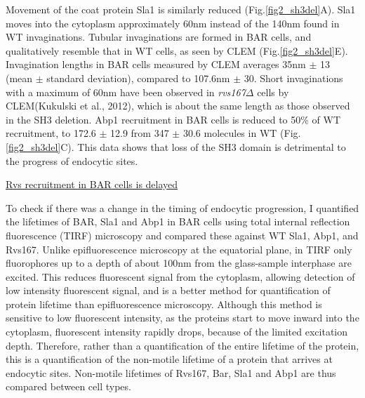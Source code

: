 Movement of the coat protein Sla1 is similarly reduced (Fig.\ref{fig2_sh3del}A). Sla1 moves into the cytoplasm approximately 60nm instead of the 140nm found in WT invaginations. Tubular invaginations are formed in BAR cells, and qualitatively resemble that in WT cells, as seen by CLEM  (Fig.\ref{fig2_sh3del}E). Invagination lengths in BAR cells measured by CLEM averages 35nm $\pm$ 13 (mean $\pm$ standard deviation), compared to 107.6nm $\pm$ 30. Short invaginations with a maximum of 60nm have been observed in  \textit{rvs167$\Delta$} cells  by CLEM(Kukulski et al., 2012), which is about the same length as those observed in the SH3 deletion. 
Abp1 recruitment in BAR cells is reduced to 50\% of WT recruitment, to 172.6 $\pm$ 12.9 from 347 $\pm$ 30.6 molecules in WT (Fig.\ref{fig2_sh3del}C). This data shows that loss of the SH3 domain is detrimental to the progress of endocytic sites. 


	\vspace{5mm}
		\underline{Rvs recruitment in BAR cells is delayed}
		
To check if there was a change in the timing of endocytic progression, I quantified the lifetimes of BAR, Sla1 and Abp1 in BAR cells using total internal reflection fluorescence (TIRF) microscopy and compared these against WT Sla1, Abp1, and Rvs167. Unlike epifluorescence microscopy at the equatorial plane, in TIRF only fluorophores up to a depth of about 100nm from the glass-sample interphase are excited. This reduces fluorescent signal from the cytoplasm, allowing detection of low intensity fluorescent signal, and is a better method for quantification of protein lifetime than epifluorescence microscopy. Although this method is sensitive to low fluorescent intensity, as the proteins start to move inward into the cytoplasm, fluorescent intensity rapidly drops, because of the limited excitation depth. Therefore, rather than a quantification of the entire lifetime of the protein, this is a quantification of the non-motile lifetime of a protein that arrives at endocytic sites. Non-motile lifetimes of Rvs167, Bar, Sla1 and Abp1 are thus compared between cell types. 




